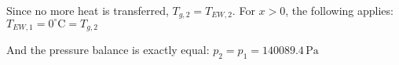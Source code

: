 Since no more heat is transferred, \( T_{g,2} = T_{EW,2} \).  
For \( x > 0 \), the following applies:  
\( T_{EW,1} = 0^\circ \text{C} = T_{g,2} \)  

And the pressure balance is exactly equal:  
\( p_2 = p_1 = 140089.4 \, \text{Pa} \)